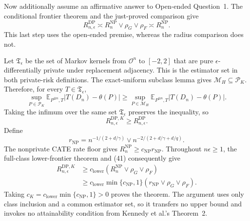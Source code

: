 Now additionally assume an affirmative answer to Open-ended Question~1.  The conditional frontier theorem and the just-proved comparison give
\[
 R_{n,\epsilon}^{\mathrm{DP}}
 \asymp R_n^{\mathrm{NP}}\vee\rho_G\vee\rho_F
 \asymp R_n^{\mathrm{NP}}.
\]
This last step uses the open-ended premise, whereas the radius comparison does not.

Let \(\mathfrak T_\epsilon\) be the set of Markov kernels from \(\mathcal O^n\) to \([-2,2]\) that are pure \(\epsilon\)-differentially private under replacement adjacency.  This is the estimator set in both private-risk definitions.  The exact-uniform subclass lemma gives \(\mathcal M_H\subseteq\mathcal P_K\).  Therefore, for every \(T\in\mathfrak T_\epsilon\),
\[
 \sup_{P\in\mathcal P_K}\mathbb E_{P^{\otimes n},T}|T(D_n)-\theta(P)|
 \ge
 \sup_{P\in\mathcal M_H}\mathbb E_{P^{\otimes n},T}|T(D_n)-\theta(P)|.
\]
Taking the infimum over the same set \(\mathfrak T_\epsilon\) preserves the inequality, so
\[
 R_{n,\epsilon}^{\mathrm{DP},K}\ge R_{n,\epsilon}^{\mathrm{DP}}.
 \tag{41}
\]
Define
\[
 r_{\mathrm{NP}}=n^{-1/(2+d/\gamma)}\vee n^{-2/(2+d/\gamma+d/q)}.
\]
The nonprivate CATE rate floor gives \(R_n^{\mathrm{NP}}\ge c_{\mathrm{NP}}r_{\mathrm{NP}}\).  Throughout \(n\epsilon\ge1\), the full-class lower-frontier theorem and (41) consequently give
\[
\begin{split}
 R_{n,\epsilon}^{\mathrm{DP},K}
 &\ge c_{\mathrm{lower}}
 \left(R_n^{\mathrm{NP}}\vee\rho_G\vee\rho_F\right)\\
 &\ge c_{\mathrm{lower}}\min\{c_{\mathrm{NP}},1\}
 \left(r_{\mathrm{NP}}\vee\rho_G\vee\rho_F\right).
\end{split}
\]
Taking \(c_K=c_{\mathrm{lower}}\min\{c_{\mathrm{NP}},1\}>0\) proves the theorem.  The argument uses only class inclusion and a common estimator set, so it transfers no upper bound and invokes no attainability condition from Kennedy et al.'s Theorem~2.
